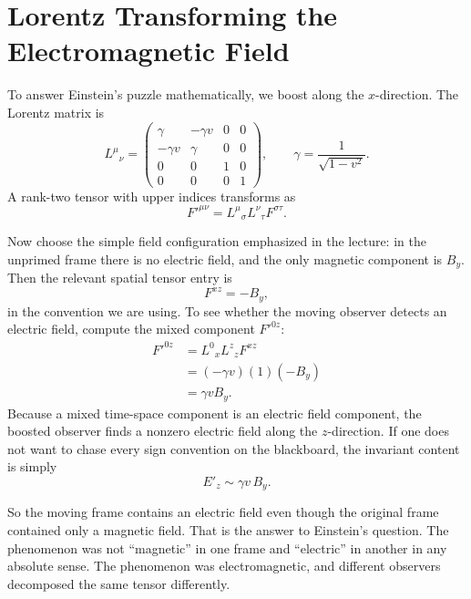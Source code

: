 \section{Lorentz Transforming the Electromagnetic Field}

To answer Einstein's puzzle mathematically, we boost along the $x$-direction. The Lorentz matrix is
\begin{equation}
L^\mu{}_\nu=
\begin{pmatrix}
\gamma & -\gamma v & 0 & 0 \\
-\gamma v & \gamma & 0 & 0 \\
0 & 0 & 1 & 0 \\
0 & 0 & 0 & 1
\end{pmatrix},
\qquad
\gamma=\frac{1}{\sqrt{1-v^2}}.
\end{equation}
A rank-two tensor with upper indices transforms as
\begin{equation}
F'^{\mu\nu}=L^\mu{}_\sigma L^\nu{}_\tau F^{\sigma\tau}.
\end{equation}

Now choose the simple field configuration emphasized in the lecture: in the unprimed frame there is no electric field, and the only magnetic component is $B_y$. Then the relevant spatial tensor entry is
\begin{equation}
F^{xz}=-B_y,
\end{equation}
in the convention we are using. To see whether the moving observer detects an electric field, compute the mixed component $F'^{0z}$:
\begin{align}
F'^{0z}
&=L^0{}_x L^z{}_z F^{xz} \\
&=(-\gamma v)(1)(-B_y) \\
&=\gamma v B_y.
\end{align}
Because a mixed time-space component is an electric field component, the boosted observer finds a nonzero electric field along the $z$-direction. If one does not want to chase every sign convention on the blackboard, the invariant content is simply
\begin{equation}
E'_z \sim \gamma v\,B_y.
\end{equation}

So the moving frame contains an electric field even though the original frame contained only a magnetic field. That is the answer to Einstein's question. The phenomenon was not ``magnetic'' in one frame and ``electric'' in another in any absolute sense. The phenomenon was electromagnetic, and different observers decomposed the same tensor differently.

